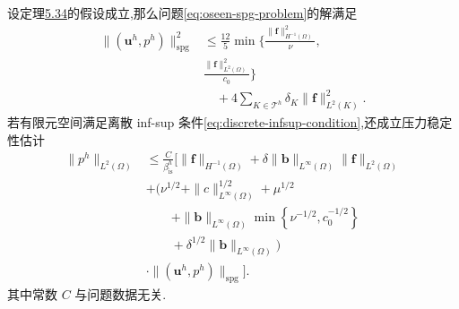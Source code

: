 \begin{lemma}[有限元解的稳定性]\label{lem:oseen-spg-stability}
设定理\hyperref[thm:oseen-spg-existence-uniqueness]{5.34}的假设成立,那么问题\cref{eq:oseen-spg-problem}的解满足
\begin{equation}\label{eq:oseen-spg-stability}
\begin{aligned}
 \|(\bm{u}^h,p^h)\|_{\mathrm{spg}}^2
  &\le \frac{12}{5}\min\Biggl\{
       \frac{\|\bm{f}\|_{H^{-1}(\Omega)}^2}{\nu},\\
       &\frac{\|\bm{f}\|_{L^2(\Omega)}^2}{c_0}\Biggr\}\\
       &\quad+4\sum_{K\in\mathcal{T}^h}\delta_K
             \|\bm{f}\|_{L^2(K)}^2.
\end{aligned}
\end{equation}
若有限元空间满足离散 inf-sup 条件\cref{eq:discrete-infsup-condition},还成立压力稳定性估计
\begin{equation}\label{eq:oseen-spg-pressure-stability}
\begin{aligned}
 \|p^h\|_{L^2(\Omega)}
  &\le \frac{C}{\beta_{\mathrm{is}}^h}\Biggl[
       \|\bm{f}\|_{H^{-1}(\Omega)}
        +\delta\|\bm{b}\|_{L^\infty(\Omega)}
                         \|\bm{f}\|_{L^2(\Omega)}\\
       &+\Biggl(\nu^{1/2}+\|c\|_{L^\infty(\Omega)}^{1/2}
          +\mu^{1/2}\\
       &\qquad+\|\bm{b}\|_{L^\infty(\Omega)}
             \min\left\{\nu^{-1/2},c_0^{-1/2}\right\}\\
       &\qquad+\delta^{1/2}\|\bm{b}\|_{L^\infty(\Omega)}\Biggr)\\
       &\cdot\|(\bm{u}^h,p^h)\|_{\mathrm{spg}}\Biggr].
\end{aligned}
\end{equation}
其中常数 $C$ 与问题数据无关.
\end{lemma}
